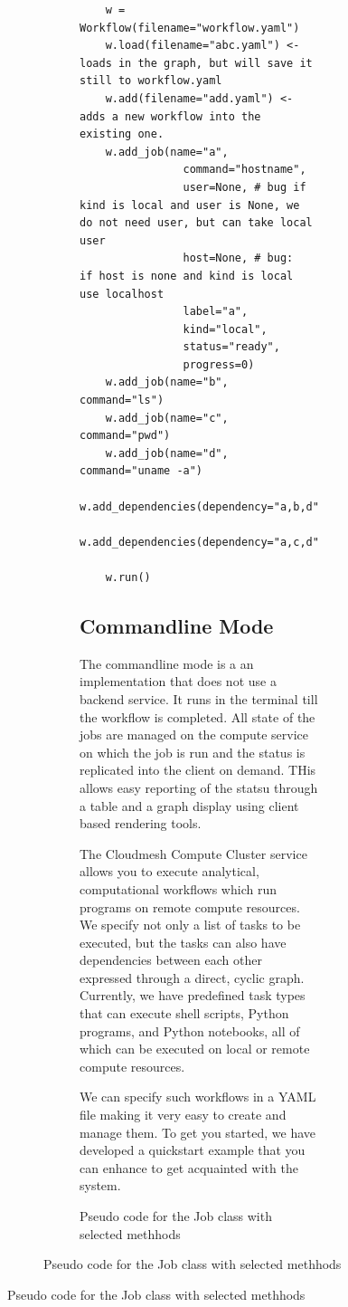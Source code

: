 \begin{figure}[htb]
\begin{figure}[htb]
\begin{figure}[htb]
\caption{Pseudo code for the Job class with selected methhods}
\label{fig:code-workflow-example}
\begin{verbatim}
    w = Workflow(filename="workflow.yaml")
    w.load(filename="abc.yaml") <- loads in the graph, but will save it still to workflow.yaml
    w.add(filename="add.yaml") <-adds a new workflow into the existing one.
    w.add_job(name="a",
                command="hostname",
                user=None, # bug if kind is local and user is None, we do not need user, but can take local user
                host=None, # bug:  if host is none and kind is local use localhost
                label="a",
                kind="local",
                status="ready",
                progress=0)
    w.add_job(name="b", command="ls")
    w.add_job(name="c", command="pwd")
    w.add_job(name="d", command="uname -a")
    w.add_dependencies(dependency="a,b,d")
    w.add_dependencies(dependency="a,c,d")

    w.run()
\end{verbatim}


\subsection{Commandline Mode}

The commandline mode is a an implementation that does not use a
backend service. It runs in the terminal till the workflow is
completed. All state of the jobs are managed on the compute service on
which the job is run and the status is replicated into the client on
demand. THis allows easy reporting of the statsu through a table and a
graph display using client based rendering tools. 


The Cloudmesh Compute Cluster service allows you to execute analytical,
computational workflows which run programs on remote compute resources.
We specify not only a list of tasks to be executed, but the tasks can
also have dependencies between each other expressed through a direct,
cyclic graph. Currently, we have predefined task types that can execute
shell scripts, Python programs, and Python notebooks, all of which can
be executed on local or remote compute resources.


We can specify such workflows in a YAML file making it very easy to
create and manage them. To get you started, we have developed a
quickstart example that you can enhance to get acquainted with the
system.


\end{figure}
\end{figure}
\end{figure}
